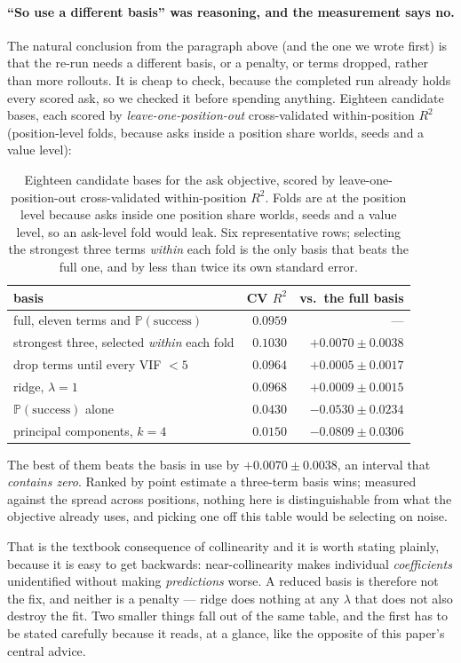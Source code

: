\documentclass[11pt,letterpaper]{article}
\newcommand{\Prob}{\ensuremath{\mathbb{P}}}
\begin{document}
\paragraph{``So use a different basis'' was reasoning, and the measurement says
no.} The natural conclusion from the paragraph above (and the one we wrote
first) is that the re-run needs a different basis, or a penalty, or terms
dropped, rather than more rollouts. It is cheap to check, because the completed
run already holds every scored ask, so we checked it before spending anything.
Eighteen candidate bases, each scored by \emph{leave-one-position-out}
cross-validated within-position $R^2$ (position-level folds, because asks inside
a position share worlds, seeds and a value level):
\begin{table}[t]
\centering
\begin{tabular}{lrr}
\toprule
basis & CV $R^2$ & vs.\ the full basis \\
\midrule
full, eleven terms and $\Prob(\text{success})$ & $0.0959$ & --- \\
strongest three, selected \emph{within} each fold & $\mathbf{0.1030}$ & $+0.0070 \pm 0.0038$ \\
drop terms until every VIF $< 5$ & $0.0964$ & $+0.0005 \pm 0.0017$ \\
ridge, $\lambda = 1$ & $0.0968$ & $+0.0009 \pm 0.0015$ \\
$\Prob(\text{success})$ alone & $0.0430$ & $-0.0530 \pm 0.0234$ \\
principal components, $k = 4$ & $0.0150$ & $-0.0809 \pm 0.0306$ \\
\bottomrule
\end{tabular}
\caption{Eighteen candidate bases for the ask objective, scored by leave-one-position-out cross-validated within-position $R^2$. Folds are at the position level because asks inside one position share worlds, seeds and a value level, so an ask-level fold would leak. Six representative rows; selecting the strongest three terms \emph{within} each fold is the only basis that beats the full one, and by less than twice its own standard error.}
\label{tab:basis}
\end{table}
The best of them beats the basis in use by $+0.0070 \pm 0.0038$, an interval
that \emph{contains zero}. Ranked by point estimate a three-term basis wins;
measured against the spread across positions, nothing here is distinguishable
from what the objective already uses, and picking one off this table would be
selecting on noise.

That is the textbook consequence of collinearity and it is worth stating
plainly, because it is easy to get backwards: near-collinearity makes individual
\emph{coefficients} unidentified without making \emph{predictions} worse. A
reduced basis is therefore not the fix, and neither is a penalty --- ridge does
nothing at any $\lambda$ that does not also destroy the fit. Two smaller things
fall out of the same table, and the first has to be stated carefully because it
reads, at a glance, like the opposite of this paper's central advice.
\end{document}
